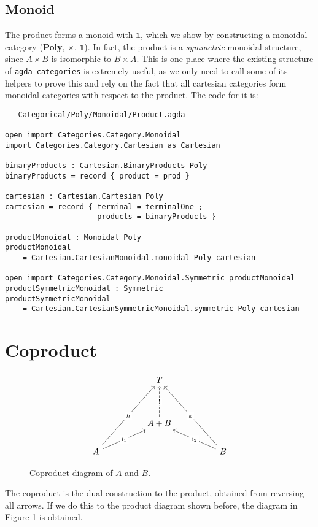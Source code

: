 \subsection{Monoid}

The product forms a monoid with $\mathbb{1}$, which we show by constructing a monoidal category (\textbf{Poly}, $\times$, $\mathbb{1}$). In fact, the product is a \textit{symmetric} monoidal structure, since $A \times B$ is isomorphic to $B \times A$. This is one place where the existing structure of \texttt{agda-categories} is extremely useful, as we only need to call some of its helpers to prove this and rely on the fact that all cartesian categories form monoidal categories with respect to the product. The code for it is:

\begin{verbatim}
-- Categorical/Poly/Monoidal/Product.agda

open import Categories.Category.Monoidal
import Categories.Category.Cartesian as Cartesian

binaryProducts : Cartesian.BinaryProducts Poly
binaryProducts = record { product = prod }

cartesian : Cartesian.Cartesian Poly
cartesian = record { terminal = terminalOne ; 
                     products = binaryProducts }

productMonoidal : Monoidal Poly
productMonoidal 
    = Cartesian.CartesianMonoidal.monoidal Poly cartesian

open import Categories.Category.Monoidal.Symmetric productMonoidal
productSymmetricMonoidal : Symmetric
productSymmetricMonoidal 
    = Cartesian.CartesianSymmetricMonoidal.symmetric Poly cartesian
\end{verbatim}

\newpage

\section{Coproduct}

\begin{figure}
  \[\begin{tikzcd}
    && T \\
    \\
    && {A + B} \\
    A &&&& B
    \arrow["{\text{i}_1}"{description}, from=4-1, to=3-3]
    \arrow["{\text{i}_2}"{description}, from=4-5, to=3-3]
    \arrow["{!}"{description}, dashed, from=3-3, to=1-3]
    \arrow["h"{description}, from=4-1, to=1-3]
    \arrow["k"{description}, from=4-5, to=1-3]
  \end{tikzcd}\]
  \caption{Coproduct diagram of $A$ and $B$.}
  \label{fig:coproductDiagram}
  \end{figure}
The coproduct is the dual construction to the product, obtained from reversing all arrows. If we do this to the product diagram shown before, the diagram in Figure \ref{fig:coproductDiagram} is obtained.

